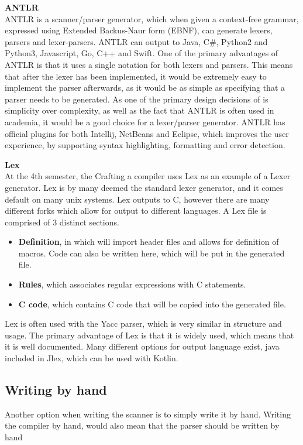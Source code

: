 \textbf{ANTLR}\\
ANTLR is a scanner/parser generator, which when given a context-free grammar, expressed using Extended Backus-Naur form (EBNF), can generate lexers, parsers and lexer-parsers\cite{ANTLR}.
ANTLR can output to Java, C\#, Python2 and Python3, Javascript, Go, C++ and Swift\cite{ANTLRDocsTargets}.
One of the primary advantages of ANTLR is that it uses a single notation for both lexers and parsers\cite{ANTLRDocs}.
This means that after the lexer has been implemented, it would be extremely easy to implement the parser afterwards, as it would be as simple as specifying that a parser needs to be generated.
As one of the primary design decisions of is simplicity over complexity, as well as the fact that ANTLR is often used in academia, it would be a good choice for a lexer/parser generator.
ANTLR has official plugins for both Intellij, NetBeans and Eclipse, which improves the user experience, by supporting syntax highlighting, formatting and error detection.

\textbf{Lex}\\
At the 4th semester, the Crafting a compiler uses Lex as an example of a Lexer generator\cite{CraftingACompiler}.
Lex is by many deemed the standard lexer generator, and it comes default on many unix systems.
Lex outputs to C, however there are many different forks which allow for output to different languages.
A Lex file is comprised of 3 distinct sections\cite{Lex}.
\begin{itemize}
	\item \textbf{Definition}, in which will import header files and allows for definition of macros. Code can also be written here, which will be put in the generated file.
	\item \textbf{Rules}, which associates regular expressions with C statements.
	\item \textbf{C code}, which contains C code that will be copied into the generated file.
\end{itemize}
Lex is often used with the Yacc parser, which is very similar in structure and usage.
The primary advantage of Lex is that it is widely used, which means that it is well documented.
Many different options for output language exist, java included in Jlex\cite{JLex}, which can be used with Kotlin.

\subsection{Writing by hand}
Another option when writing the scanner is to simply write it by hand.
Writing the compiler by hand, would also mean that the parser should be written by hand

